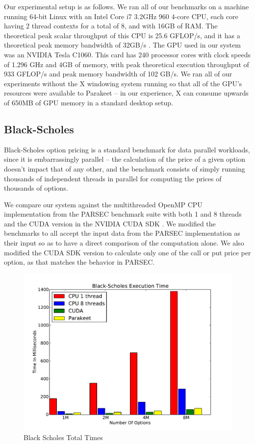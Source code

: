 \documentclass[preprint]{sigplanconf}
\begin{document}
Our experimental setup is as follows.  We ran all of our benchmarks on a machine running 64-bit Linux with an Intel Core i7 3.2GHz 960 4-core CPU, each core having 2 thread contexts for a total of 8, and with 16GB of RAM.  The theoretical peak scalar throughput of this CPU is 25.6 GFLOP/s, and it has a theoretical peak memory bandwidth of 32GB/s \cite{Lee10}.  The GPU used in our system was an NVIDIA Tesla C1060. This card has 240 processor cores with clock speeds of 1.296 GHz and 4GB of memory, with peak theoretical execution throughput of 933 GFLOP/s and peak memory bandwidth of 102 GB/s.  We ran all of our experiments without the X windowing system running so that all of the GPU's resources were available to Parakeet -- in our experience, X can consume upwards of 650MB of GPU memory in a standard desktop setup.

\subsection{Black-Scholes}
\label{results-bs}

Black-Scholes option pricing \cite{Blac73} is a standard benchmark for data parallel workloads, since it is embarrassingly parallel -- the calculation of the price of a given option doesn't impact that of any other, and the benchmark consists of simply running thousands of independent threads in parallel for computing the prices of thousands of options.

We compare our system against the multithreaded OpenMP CPU implementation from the PARSEC \cite{Bien08} benchmark suite with both 1 and 8 threads and the CUDA version in the NVIDIA CUDA SDK \cite{NvidSD}.  We modified the benchmarks to all accept the input data from the PARSEC implementation as their input so as to have a direct comparison of the computation alone.  We also modified the CUDA SDK version to calculate only one of the call or put price per option, as that matches the behavior in PARSEC.

\begin{figure}
\includegraphics[scale=0.45]{BSWCPU.pdf}
\caption{Black Scholes Total Times}
\label{BSCPU}
\end{figure}
\end{document}
